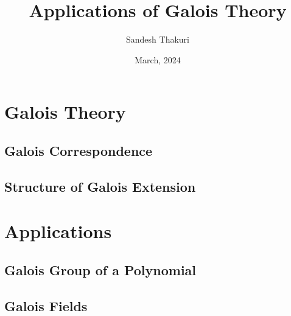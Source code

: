\documentclass[a4paper,12pt,oneside,onecolumn,openany,final]{memoir}
\title{Applications of Galois Theory}
\author{Sandesh Thakuri}
\date{March, 2024}
\begin{document}
\frontmatter







\tableofcontents  %

\mainmatter



\part{Galois Theory}
\chapter{Galois Correspondence}


%

\chapter{Structure of Galois Extension}




\part{Applications}
\chapter{Galois Group of a Polynomial}


\chapter{Galois Fields}


\backmatter


\end{document}
